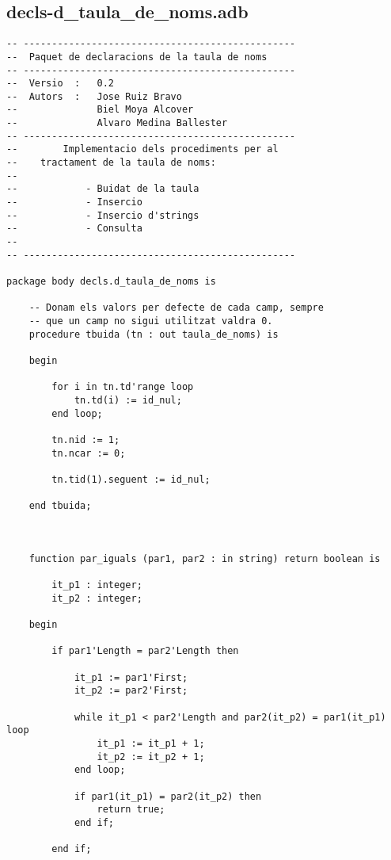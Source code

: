 \documentclass[10pt]{report}
\begin{document}
    \newpage
    \subsection{decls-d\_taula\_de\_noms.adb}
    \begin{lstlisting}[style=Ada]
-- ------------------------------------------------
--  Paquet de declaracions de la taula de noms
-- ------------------------------------------------
--  Versio  :   0.2
--  Autors  :   Jose Ruiz Bravo
--              Biel Moya Alcover
--              Alvaro Medina Ballester
-- ------------------------------------------------
--        Implementacio dels procediments per al
--    tractament de la taula de noms:
--
--            - Buidat de la taula
--            - Insercio
--            - Insercio d'strings
--            - Consulta
--
-- ------------------------------------------------

package body decls.d_taula_de_noms is

    -- Donam els valors per defecte de cada camp, sempre 
    -- que un camp no sigui utilitzat valdra 0.
    procedure tbuida (tn : out taula_de_noms) is
    
    begin 
    
        for i in tn.td'range loop
            tn.td(i) := id_nul;
        end loop;
        
        tn.nid := 1;
        tn.ncar := 0;
        
        tn.tid(1).seguent := id_nul;
        
    end tbuida;
    
    
    
    function par_iguals (par1, par2 : in string) return boolean is
    
        it_p1 : integer;
        it_p2 : integer;
        
    begin
            
        if par1'Length = par2'Length then
            
            it_p1 := par1'First;
            it_p2 := par2'First;
                        
            while it_p1 < par2'Length and par2(it_p2) = par1(it_p1) loop
                it_p1 := it_p1 + 1;
                it_p2 := it_p2 + 1;
            end loop;
    
            if par1(it_p1) = par2(it_p2) then
                return true;
            end if;
            
        end if;
        

\end{lstlisting}
\end{document}
